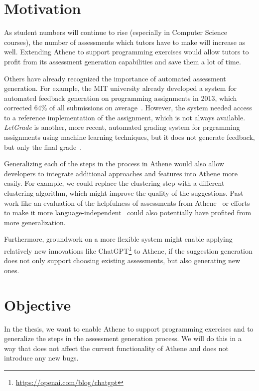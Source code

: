 \section*{Motivation}

As student numbers will continue to rise (especially in Computer Science courses), the number of assessments which tutors have to make will increase as well. Extending Athene to support programming exercises would allow tutors to profit from its assessment generation capabilities and save them a lot of time.

Others have already recognized the importance of automated assessment generation. For example, the MIT university already developed a system for automated feedback generation on programming assignments in 2013, which corrected 64\% of all submissions on average~\cite{singh2013automated}. However, the system needed access to a reference implementation of the assignment, which is not always available. 
\textit{LetGrade} is another, more recent, automated grading system for prgramming assignments using machine learning techniques, but it does not generate feedback, but only the final grade~\cite{messer2022grading}.

Generalizing each of the steps in the process in Athene would also allow developers to integrate additional approaches and features into Athene more easily.
For example, we could replace the clustering step with a different clustering algorithm, which might improve the quality of the suggestions. Past work like an evaluation of the helpfulness of assessments from Athene~\cite{atheneTracking} or efforts to make it more language-independent~\cite{atheneLanguage} could also potentially have profited from more generalization.

Furthermore, groundwork on a more flexible system might enable applying relatively new innovations like ChatGPT\footnote{\url{https://openai.com/blog/chatgpt}} to Athene, if the suggestion generation does not only support choosing existing assessments, but also generating new ones.

\section*{Objective}
In the thesis, we want to enable Athene to support programming exercises and to generalize the steps in the assessment generation process. We will do this in a way that does not affect the current functionality of Athene and does not introduce any new bugs.


